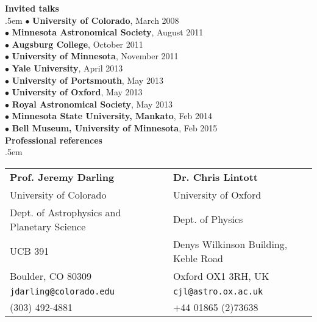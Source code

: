 {{{\medskip
\noindent
{\Large\bf Invited talks}\\[4pt]
\medskip
\parindent .5em
$\bullet$ {\bf University of Colorado}, March 2008 \\[2pt]
$\bullet$ {\bf Minnesota Astronomical Society}, August 2011 \\[2pt]
$\bullet$ {\bf Augsburg College}, October 2011 \\[2pt]
$\bullet$ {\bf University of Minnesota}, November 2011 \\[2pt]
$\bullet$ {\bf Yale University}, April 2013 \\[2pt]
$\bullet$ {\bf University of Portsmouth}, May 2013 \\[2pt]
$\bullet$ {\bf University of Oxford}, May 2013 \\[2pt]
$\bullet$ {\bf Royal Astronomical Society}, May 2013 \\[2pt]
$\bullet$ {\bf Minnesota State University, Mankato}, Feb 2014 \\[2pt]
$\bullet$ {\bf Bell Museum, University of Minnesota}, Feb 2015 \\[2pt]

\parindent0in
\medskip
\medskip
\noindent
{\Large\bf Professional references}\\[4pt]
\medskip
\parindent .5em

\begin{tabular}{@{}p{3.5in}p{3.5in}}
{\large \bf Prof. Jeremy Darling}             &     {\large \bf Dr. Chris Lintott}        \\	       
University of Colorado                        &     University of Oxford                  \\      
Dept. of Astrophysics and Planetary Science   &     Dept. of Physics  	                  \\   
UCB 391		                                  &	    Denys Wilkinson Building, Keble Road  \\ 
Boulder, CO  80309                            &     Oxford OX1 3RH, UK                    \\
{\tt jdarling@colorado.edu}                   &     {\tt cjl@astro.ox.ac.uk}              \\
(303) 492-4881                                &     +44 01865 (2)73638                    \\[8pt]


\end{tabular}}}}
